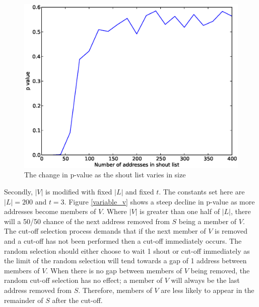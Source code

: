 \documentclass[ %
                    author={Luke Murray},
                supervisor={Dr. Simon Hollis},
                     title={Shadow Peer-to-Peer Networks},
                  subtitle={},
                    degree={MEng},
                      year={2013} ]{thesis}
\begin{document}
\begin{figure}[h]
    \centering
    \begin{minipage}[b]{0.8\linewidth}
        \centering
        \includegraphics[width=\linewidth]{diagrams/variable_l.eps}
        \caption{The change in p-value as the shout list varies in size}
    \end{minipage}
    \label{variable_l}
\end{figure}

Secondly, $|V|$ is modified with fixed $|L|$ and fixed $t$. The constants set here are $|L| = 200$ and $t = 3$. Figure \ref{variable_v} shows a steep decline in p-value as more addresses become members of $V$. Where $|V|$ is greater than one half of $|L|$, there will a 50/50 chance of the next address removed from $S$ being a member of $V$. The cut-off selection process demands that if the next member of $V$ is removed and a cut-off has not been performed then a cut-off immediately occurs. The random selection should either choose to wait 1 shout or cut-off immediately as the limit of the random selection will tend towards a gap of 1 address between members of $V$. When there is no gap between members of $V$ being removed, the random cut-off selection has no effect; a member of $V$ will always be the last address removed from $S$. Therefore, members of $V$ are less likely to appear in the remainder of $S$ after the cut-off.
\end{document}
